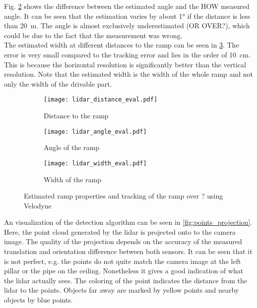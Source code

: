 Fig. \ref{fig:lidar_angle_eval} shows the difference between the estimated angle and the HOW measured angle.
It can be seen that the estimation varies by about \ang{1} if the distance is less than \SI{20}{\metre}.
The angle is almost exclusively underestimated (OR OVER?), which could be due to the fact that the measurement was wrong.\\
The estimated width at different distances to the ramp can be seen in \cref{fig:lidar_width_eval}.
The error is very small compared to the tracking error and lies in the order of \SI{10}{\cm}.
This is because the horizontal resolution is significantly better than the vertical resolution.
Note that the estimated width is the width of the whole ramp and not only the width of the drivable part.\\
\begin{figure}[htbp]
	\centering
	\begin{subfigure}{1\textwidth}
		\centering
		\texttt{[image: lidar\_distance\_eval.pdf]}
		\caption{Distance to the ramp}
		\label{fig:lidar_distance_eval}
	\end{subfigure}
	
	\begin{subfigure}{1\textwidth}
		\centering
		\texttt{[image: lidar\_angle\_eval.pdf]}
		\caption{Angle of the ramp}
		\label{fig:lidar_angle_eval}
	\end{subfigure}
	
	\begin{subfigure}{1\textwidth}
		\centering
		\texttt{[image: lidar\_width\_eval.pdf]}
		\caption{Width of the ramp}
		\label{fig:lidar_width_eval}
	\end{subfigure}
	\caption{Estimated ramp properties and tracking of the ramp over ? using Velodyne}
	\label{fig:lidar_eval}
\end{figure}
An visualization of the detection algorithm can be seen in \cref{fig:points_projection}.
Here, the point cloud generated by the \gls{lidar} is projected onto to the camera image.
The quality of the projection depends on the accuracy of the measured translation and orientation difference between both sensors.
It can be seen that it is not perfect, e.g. the points do not quite match the camera image at the left pillar or the pipe on the ceiling.
Nonetheless it gives a good indication of what the \gls{lidar} actually sees.
The coloring of the point indicates the distance from the \gls{lidar} to the points.
Objects far away are marked by yellow points and nearby objects by blue points.
